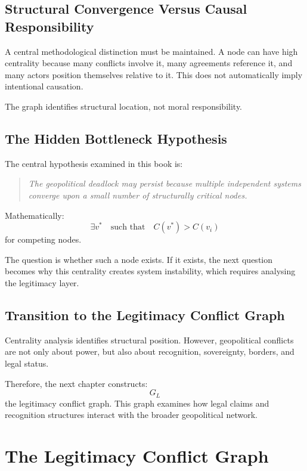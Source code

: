 \documentclass[11pt,openany]{book}
\theoremstyle{plain}
\theoremstyle{definition}
\begin{document}
\section*{Structural Convergence Versus Causal Responsibility}

A central methodological distinction must be maintained. A node can have high centrality because many conflicts involve it, many agreements reference it, and many actors position themselves relative to it. This does not automatically imply intentional causation.

The graph identifies structural location, not moral responsibility.

\section*{The Hidden Bottleneck Hypothesis}

The central hypothesis examined in this book is:
\begin{quote}
\textit{The geopolitical deadlock may persist because multiple independent systems converge upon a small number of structurally critical nodes.}
\end{quote}

Mathematically:
\[
\exists v^* \quad \text{such that} \quad C(v^*) > C(v_i)
\]
for competing nodes.

The question is whether such a node exists. If it exists, the next question becomes why this centrality creates system instability, which requires analysing the legitimacy layer.

\section*{Transition to the Legitimacy Conflict Graph}

Centrality analysis identifies structural position. However, geopolitical conflicts are not only about power, but also about recognition, sovereignty, borders, and legal status. 

Therefore, the next chapter constructs:
\[
\boxed{
G_L
}
\]
the legitimacy conflict graph. This graph examines how legal claims and recognition structures interact with the broader geopolitical network.

\chapter{The Legitimacy Conflict Graph}
\end{document}
